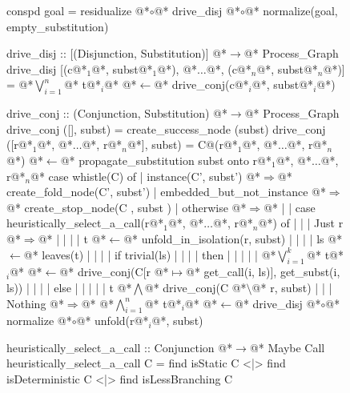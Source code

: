 \documentclass[12pt,a4paper]{report}
\begin{document}
\thispagestyle{empty}
\begin{figure}[h]
\begin{PseudoCode}[moredelim={[is][stringstyle]{@@}{@@}},
  moredelim={[is][\color{dkgreen}\bfseries]{@!}{@!}},
  moredelim={[is][\color{red}\bfseries]{!!}{!!}}]
conspd goal = residualize @*$\circ$@* drive_disj @*$\circ$@* normalize(goal, empty_substitution)

drive_disj :: [(Disjunction, Substitution)] @*$\to$@* Process_Graph
drive_disj [(c@*$_1$@*, subst@*$_1$@*), @*$\dots$@*, (c@*$_n$@*, subst@*$_n$@*)] = @*$\bigvee_{i=1}^n$@* t@*$_i$@* @*$\leftarrow$@* drive_conj(c@*$_i$@*, subst@*$_i$@*)

drive_conj :: (Conjunction, Substitution) @*$\to$@* Process_Graph
drive_conj ([], subst) = create_success_node (subst)
drive_conj ([r@*$_1$@*, @*$\dots$@*, r@*$_n$@*], subst) =
  C@(r@*$_1$@*, @*$\dots$@*, r@*$_n$@*) @*$\leftarrow$@* propagate_substitution subst onto r@*$_1$@*, @*$\dots$@*, r@*$_n$@*
  case whistle(C) of
  | instance(C', subst')      @*$\Rightarrow$@* create_fold_node(C', subst')
  | embedded_but_not_instance @*$\Rightarrow$@* create_stop_node(C , subst )
  | otherwise @*$\Rightarrow$@*
  | | case heuristically_select_a_call(r@*$_1$@*, @*$\dots$@*, r@*$_n$@*) of
  | | | Just r @*$\Rightarrow$@*
  | | | | t @*$\leftarrow$@* unfold_in_isolation(r, subst)
  | | | | ls @*$\leftarrow$@* leaves(t)
  | | | | if trivial(ls)
  | | | | then
  | | | | | @*$\bigvee_{i=1}^k$@* t@*$_i$@* @*$\leftarrow$@* drive_conj(C[r @*$\mapsto$@* get_call(i, ls)], get_subst(i, ls))
  | | | | else
  | | | | | t @*$\bigwedge$@* drive_conj(C @*$\setminus$@* r, subst)
  | | | Nothing @*$\Rightarrow$@* @*$\bigwedge_{i=1}^n$@* t@*$_i$@* @*$\leftarrow$@* drive_disj @*$\circ$@* normalize @*$\circ$@* unfold(r@*$_i$@*, subst)

heuristically_select_a_call :: Conjunction @*$\to$@* Maybe Call
heuristically_select_a_call C =
  find isStatic C <|> find isDeterministic C <|> find isLessBranching C
\end{PseudoCode}
\end{figure}
\end{document}
